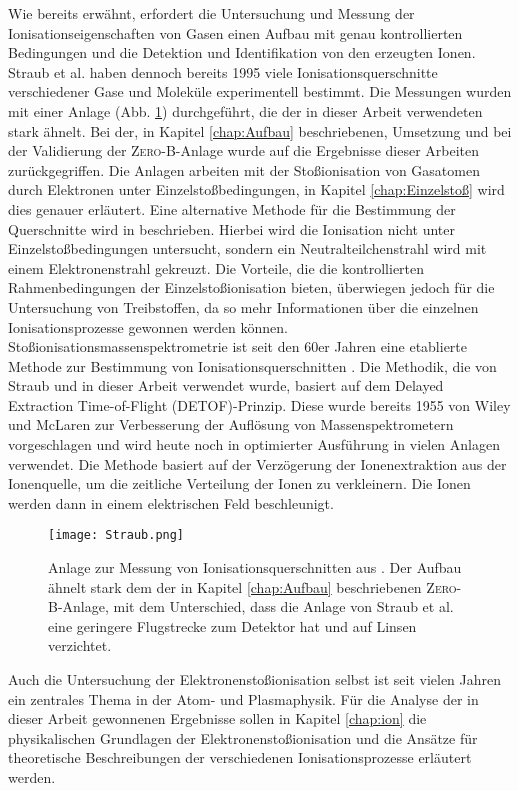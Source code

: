Wie bereits erwähnt, erfordert die Untersuchung und Messung der Ionisationseigenschaften von Gasen einen Aufbau mit genau kontrollierten Bedingungen und die Detektion und Identifikation von den erzeugten Ionen. Straub et al. \cite{Straub,Straub2} haben dennoch bereits 1995 viele Ionisationsquerschnitte verschiedener Gase und Moleküle experimentell bestimmt. Die Messungen wurden mit einer Anlage (Abb. \ref{fig:Straub}) durchgeführt, die der in dieser Arbeit verwendeten stark ähnelt. Bei der, in Kapitel \ref{chap:Aufbau} beschriebenen, Umsetzung und bei der Validierung der \textsc{Zero-B}-Anlage wurde auf die Ergebnisse dieser Arbeiten zurückgegriffen. Die Anlagen arbeiten mit der Stoßionisation von Gasatomen durch Elektronen unter Einzelstoßbedingungen, in Kapitel \ref{chap:Einzelstoß} wird dies genauer erläutert. Eine alternative Methode für die Bestimmung der Querschnitte wird in \cite{other_method} beschrieben. Hierbei wird die Ionisation nicht unter Einzelstoßbedingungen untersucht, sondern ein Neutralteilchenstrahl wird mit einem Elektronenstrahl gekreuzt. Die Vorteile, die die kontrollierten Rahmenbedingungen der Einzelstoßionisation bieten, überwiegen jedoch für die Untersuchung von Treibstoffen, da so mehr Informationen über die einzelnen Ionisationsprozesse gewonnen werden können.
Stoßionisationsmassenspektrometrie ist seit den 60er Jahren eine etablierte Methode zur Bestimmung von Ionisationsquerschnitten \cite{EITOFMS}. Die Methodik, die von Straub  und in dieser Arbeit verwendet wurde, basiert auf dem Delayed Extraction Time-of-Flight (DETOF)-Prinzip. Diese wurde bereits 1955 von Wiley und McLaren zur Verbesserung der Auflösung von Massenspektrometern vorgeschlagen \cite{DETOF} und wird heute noch in optimierter Ausführung in vielen Anlagen verwendet. Die Methode basiert auf der Verzögerung der Ionenextraktion aus der Ionenquelle, um die zeitliche Verteilung der Ionen zu verkleinern. Die Ionen werden dann in einem elektrischen Feld beschleunigt.
\begin{figure}
    \centering
    \texttt{[image: Straub.png]}
    \caption[Anlage zur Messung von Ionisationsquerschnitten von Straub et al.]{Anlage zur Messung von Ionisationsquerschnitten aus \cite{Straub2}. Der Aufbau ähnelt stark dem der in Kapitel \ref{chap:Aufbau} beschriebenen \textsc{Zero-B}-Anlage, mit dem Unterschied, dass die Anlage von Straub et al. eine geringere Flugstrecke zum Detektor hat und auf Linsen verzichtet.}
    \label{fig:Straub}
\end{figure}
Auch die Untersuchung der Elektronenstoßionisation selbst ist seit vielen Jahren ein zentrales Thema in der Atom- und Plasmaphysik. Für die Analyse der in dieser Arbeit gewonnenen Ergebnisse sollen in Kapitel \ref{chap:ion} die physikalischen Grundlagen der Elektronenstoßionisation und die Ansätze für theoretische Beschreibungen der verschiedenen Ionisationsprozesse erläutert werden.